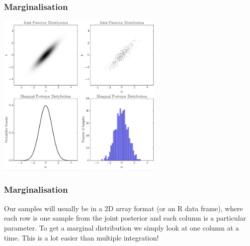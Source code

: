 \documentclass{beamer}
\begin{document}
\begin{frame}
\frametitle{Marginalisation}
\centering
\includegraphics[width=0.6\textwidth]{images/marginalisation.png}

\end{frame}

\begin{frame}
\frametitle{Marginalisation}
Our samples will usually be in a 2D array format (or an R data frame),
where each row is one sample from the joint posterior and each column is
a particular parameter.
To get a marginal distribution we simply look at one column at a time.
This is a lot easier than multiple integration!

\end{frame}
\end{document}
